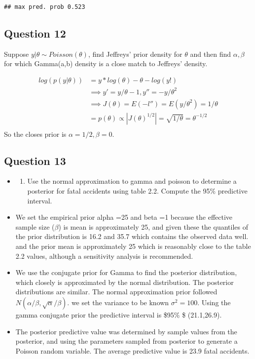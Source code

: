 \documentclass[
]{book}
\providecommand{\tightlist}{%
  \setlength{\itemsep}{0pt}\setlength{\parskip}{0pt}}
\theoremstyle{definition}
\theoremstyle{definition}
\theoremstyle{definition}
\theoremstyle{definition}
\theoremstyle{remark}
\begin{document}
\begin{verbatim}
## max pred. prob 0.523
\end{verbatim}

\hypertarget{question-12}{%
\subsection*{Question 12}\label{question-12}}

Suppose \(y|\theta \sim Poisson(\theta)\), find Jeffreys' prior density for \(\theta\) and then find \(\alpha,\beta\) for which Gamma(a,b) density is a close match to Jeffreys' density.

\[
\begin{aligned}
 log(p(y|\theta))&= y*log(\theta)-\theta -log(y!)\\
 &\implies y' = y/\theta - 1 ,  y'' = -y/\theta^2 \\
 &\implies J(\theta)= E(- l'')= E(y/\theta^2)= 1/\theta \\
 &= p(\theta)\propto |J(\theta)^{1/2}| = \sqrt{1/\theta} = \theta^{-1/2}\\
\end{aligned}
\]
So the closes prior is \(\alpha=1/2 , \beta=0\).

\hypertarget{question-13}{%
\subsection*{Question 13}\label{question-13}}

\begin{itemize}
\item
  \begin{enumerate}
  \def\labelenumi{(\alph{enumi})}
  \tightlist
  \item
    Use the normal approximation to gamma and poisson to determine a posterior for fatal accidents using table 2.2. Compute the 95\(\%\) predictive interval.
  \end{enumerate}
\item
  We set the empirical prior alpha =25 and beta =1 because the effective sample size (\(\beta\)) is mean is approximately 25, and given these the quantiles of the prior distribution is 16.2 and 35.7 which contains the observed data well. and the prior mean is approximately 25 which is reasonably close to the table 2.2 values, although a sensitivity analysis is recommended.
\item
  We use the conjugate prior for Gamma to find the posterior distribution, which closely is approximated by the normal distribution. The posterior distributions are similar. The normal approximation prior followed \(N(\alpha/\beta, \sqrt{\alpha}/\beta)\). we set the variance to be known \(\sigma^2=100\). Using the gamma conjugate prior the predictive interval is \$95\% \$ (21.1,26.9).
\item
  The posterior predictive value was determined by sample values from the posterior, and using the parameters sampled from posterior to generate a Poisson random variable. The average predictive value is 23.9 fatal accidents.
\end{itemize}
\end{document}
